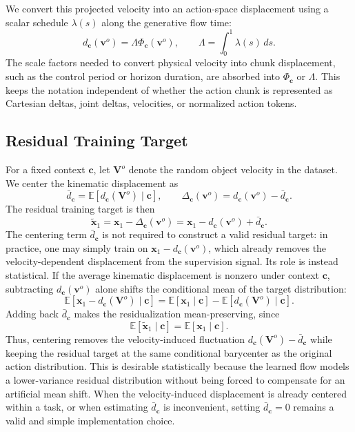 \documentclass[10pt,twocolumn,letterpaper]{article}
\begin{document}
We convert this projected velocity into an action-space displacement using a
scalar schedule $\lambda(s)$ along the generative flow time:
\begin{equation}
    d_{\mathbf c}(\mathbf v^{o})
    =
    \Lambda \Phi_{\mathbf c}(\mathbf v^{o}),
    \qquad
    \Lambda=\int_0^1 \lambda(s)\,ds .
    \label{eq:integrated_velocity_displacement}
\end{equation}
The scale factors needed to convert physical velocity into chunk displacement,
such as the control period or horizon duration, are absorbed into
$\Phi_{\mathbf c}$ or $\Lambda$. This keeps the notation independent of whether
the action chunk is represented as Cartesian deltas, joint deltas, velocities,
or normalized action tokens.

\subsection{Residual Training Target}
\label{subsec:residual_target}

For a fixed context $\mathbf c$, let $\mathbf V^{o}$ denote the random object
velocity in the dataset. We center the kinematic displacement as
\[
    \bar d_{\mathbf c}
    =
    \mathbb E[d_{\mathbf c}(\mathbf V^{o})\mid\mathbf c],
    \qquad
    \Delta_{\mathbf c}(\mathbf v^{o})
    =
    d_{\mathbf c}(\mathbf v^{o})-\bar d_{\mathbf c}.
\]
The residual training target is then
\begin{equation}
    \widetilde{\mathbf x}_1
    =
    \mathbf x_1-\Delta_{\mathbf c}(\mathbf v^{o})
    =
    \mathbf x_1-d_{\mathbf c}(\mathbf v^{o})+\bar d_{\mathbf c}.
    \label{eq:residual_target}
\end{equation}
The centering term $\bar d_{\mathbf c}$ is not required to construct a valid
residual target: in practice, one may simply train on
$\mathbf x_1-d_{\mathbf c}(\mathbf v^o)$, which already removes the
velocity-dependent displacement from the supervision signal. Its role is instead
statistical. If the average kinematic displacement is nonzero under context
$\mathbf c$, subtracting $d_{\mathbf c}(\mathbf v^o)$ alone shifts the
conditional mean of the target distribution:
\[
    \mathbb E[\mathbf x_1-d_{\mathbf c}(\mathbf V^o)\mid \mathbf c]
    =
    \mathbb E[\mathbf x_1\mid \mathbf c]
    -
    \mathbb E[d_{\mathbf c}(\mathbf V^o)\mid \mathbf c].
\]
Adding back $\bar d_{\mathbf c}$ makes the residualization mean-preserving,
since
\[
    \mathbb E[\widetilde{\mathbf x}_1\mid \mathbf c]
    =
    \mathbb E[\mathbf x_1\mid \mathbf c].
\]
Thus, centering removes the velocity-induced fluctuation
$d_{\mathbf c}(\mathbf V^o)-\bar d_{\mathbf c}$ while keeping the residual
target at the same conditional barycenter as the original action distribution.
This is desirable statistically because the learned flow models a lower-variance
residual distribution without being forced to compensate for an artificial mean
shift. When the velocity-induced displacement is already centered within a task,
or when estimating $\bar d_{\mathbf c}$ is inconvenient, setting
$\bar d_{\mathbf c}=0$ remains a valid and simple implementation choice.
\end{document}
